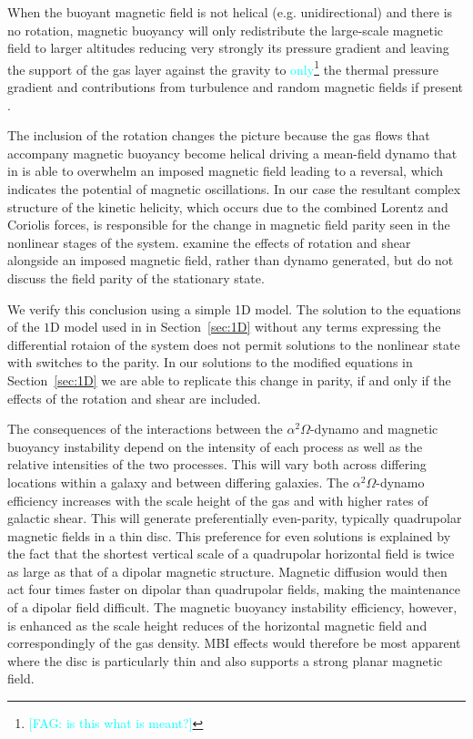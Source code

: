 \documentclass[fleqn,usenatbib]{mnras}
\newcommand{\fg}[1]{\textcolor{cyan}{#1}} %
\newcommand{\fag}[1]{\textcolor{cyan}{[FAG: #1]}} %
\begin{document}
{When the buoyant magnetic field is not helical (e.g. unidirectional) and there
is no rotation, magnetic buoyancy will only redistribute the large-scale
magnetic field to larger altitudes reducing very strongly its pressure gradient
and leaving the support of the gas layer against the gravity to
\fg{only}\footnote{\fag{is this what is meant?}} the thermal pressure gradient
and contributions from turbulence and random magnetic fields if present
\citep{DT2022b}.

The inclusion of the rotation changes the picture because the gas flows that
accompany magnetic buoyancy become helical driving a mean-field dynamo that in
\citet{DT2022a} is able to overwhelm an imposed magnetic field leading to a
reversal, which indicates the potential of magnetic oscillations. In our case
the resultant complex structure of the kinetic helicity{,} which occurs due
to the combined Lorentz and Coriolis forces{,} is responsible for the change
in magnetic field parity seen in the nonlinear stages of the system.
\citet{DT2022a} examine the effects of rotation and shear alongside an imposed
magnetic field, rather than dynamo generated, but do not discuss the field
parity of the stationary state.

{We verify this conclusion using a simple 1D model. The solution to the
equations of the $1$D model used in \citet{QSTGB23} in Section~\ref{sec:1D}
without any terms expressing the differential rotaion of the system does not
permit solutions to the nonlinear state with switches to the parity.  In our
solutions to the modified equations in Section~\ref{sec:1D} we are able to
replicate this change in parity, if and only if the effects of the rotation and
shear are included.}

The consequences of the interaction{s between} the
{$\alpha^2\Omega$-}dynamo and magnetic buoyancy {instability} depend on
the {intensity of each process as well as the} relative intensities of the
two processes. {This will} vary {both across differing locations} within
a galaxy and between {differing} galaxies.  The {$\alpha^2\Omega$-}dynamo
efficiency {increases with} the scale height of the gas and {with higher
rates of galactic shear}.  {This will generate preferentially even-parity,
typically quadrupolar} magnetic fields in a thin disc.  This preference for
even solutions is explained by the fact that the shortest vertical scale of a
quadrupolar horizontal field is twice as large as that of a dipolar magnetic
structure. Magnetic diffusion would then act four times faster on dipolar than
quadrupolar fields, making the maintenance of a dipolar field difficult.
{The magnetic buoyancy instability efficiency, however, is enhanced as the
scale height reduces of the horizontal magnetic field and correspondingly of
the gas density. MBI effects would therefore be most apparent where the disc is
particularly thin and also supports a strong planar magnetic field.} 

}
\end{document}
